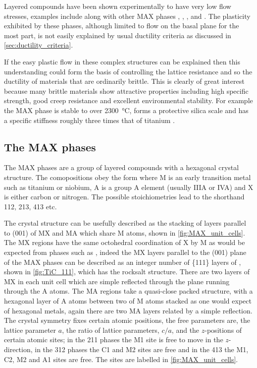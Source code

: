
Layered compounds have been shown experimentally to have very low flow stresses, examples include  along with other MAX phases \cite{Barsoum2011},  \cite{Korte2012NbCo},  \cite{Telle2006},  and  \cite{Sygnatowicz2015}. The plasticity exhibited by these phases, although limited to flow on the basal plane for the most part, is not easily explained by usual ductility criteria as discussed in \autoref{sec:ductility_criteria}. 

If the easy plastic flow in these complex structures can be explained then this understanding could form the basis of controlling the lattice resistance and so the ductility of materials that are ordinarily brittle. This is clearly of great interest because many brittle materials show attractive properties including high specific strength, good creep resistance and excellent environmental stability. For example the MAX phase  is stable to over \SI{2300}{\celsius}, forms a protective silica scale and has a specific stiffness roughly three times that of titanium \cite{Radovic2013}.

\subsection{The MAX phases}

The MAX phases are a group of layered compounds with a hexagonal crystal structure. The comopositions obey the form  where M is an early transition metal such as titanium or niobium, A is a group A element (usually IIIA or IVA) and X is either carbon or nitrogen. The possible stoichiometries lead to the shorthand 112, 213, 413 etc.

The crystal structure can be usefully described as the stacking of layers parallel to (001) of MX and MA which share M atoms,  shown in \autoref{fig:MAX_unit_cells}. The MX regions have the same octohedral coordination of X by M as would be expected from phases such as , indeed the MX layers parallel to the (001) plane of the MAX phases can be described as an integer number of \{111\} layers of , shown in \autoref{fig:TiC_111}, which has the rocksalt structure. There are two layers of MX in each unit cell which are simple reflected through the plane running through the A atoms. The MA regions take a quasi-close packed structure, with a hexagonal layer of A atoms between two of M atoms stacked as one would expect of hexagonal metals, again there are two MA layers related by a simple reflection. The crystal symmetry fixes certain atomic positions, the free parameters are, the lattice parameter $a$, the ratio of lattice parameters, $c/a$, and the $z$-positions of certain atomic sites; in the 211 phases the M1 site is free to move in the $z$-direction, in the 312 phases the C1 and M2 sites are free and in the 413 the M1, C2, M2 and A1 sites are free. The sites are labelled in \autoref{fig:MAX_unit_cells}.


